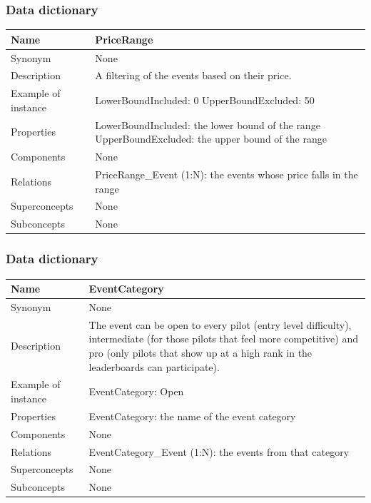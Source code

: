 \documentclass{beamer}
\begin{document}
\begin{frame}
    \frametitle{Data dictionary}
    \begin{table}
    \tiny
    \begin{tabular}{|p{2cm}|p{6cm}|}
    \hline
    Name & \textbf{PriceRange}  \\
    \hline
    Synonym & None \\
    \hline
    Description & A filtering of the events based on their price. \\
    \hline
    Example of instance &
    LowerBoundIncluded: 0 \newline
    UpperBoundExcluded: 50 \\
    \hline
    Properties &
    LowerBoundIncluded: the lower bound of the range \newline
    UpperBoundExcluded: the upper bound of the range \\
    \hline
    Components & None \\
    \hline
    Relations &
    PriceRange\_Event (1:N): the events whose price falls in the range \\
    \hline
    Superconcepts & None \\
    \hline
    Subconcepts & None \\
    \hline
    \end{tabular}
    \end{table}
\end{frame}


\begin{frame}
    \frametitle{Data dictionary}
    \begin{table}
    \tiny
    \begin{tabular}{|p{2cm}|p{6cm}|}
    \hline
    Name & \textbf{EventCategory} \\
    \hline
    Synonym & None \\
    \hline
    Description & The event can be open to every pilot (entry level difficulty),
    intermediate (for those pilots that feel more competitive) and 
    pro (only pilots that show up at a high rank in the leaderboards can participate). \\
    \hline
    Example of instance &
    EventCategory: Open \\
    \hline
    Properties &
    EventCategory: the name of the event category \\
    \hline
    Components & None \\
    \hline
    Relations &
    EventCategory\_Event (1:N): the events from that category \\
    \hline
    Superconcepts & None \\
    \hline
    Subconcepts & None \\
    \hline
    \end{tabular}
    \end{table}
\end{frame}
\end{document}
